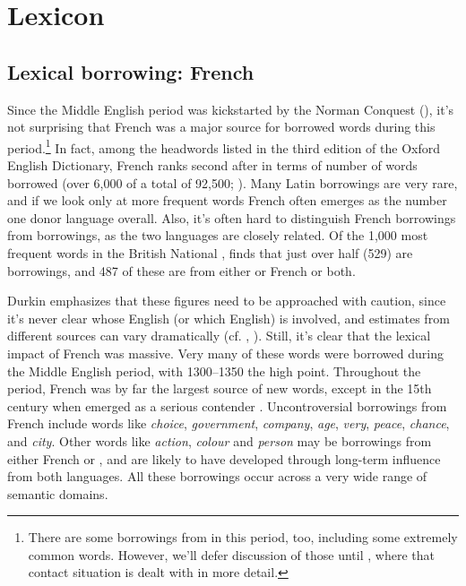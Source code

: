 \section{Lexicon}

\subsection{Lexical borrowing: French}\label{ME-French-borrowing}
Since the Middle English period was kickstarted by the Norman Conquest (), it's not surprising that French was a major source for borrowed words during this period.\footnote{There are some borrowings from  in this period, too, including some extremely common words. However, we'll defer discussion of those until , where that contact situation is dealt with in more detail.} In fact, among the headwords listed in the third edition of the Oxford English Dictionary, French ranks second after  in terms of number of words borrowed (over 6,000 of a total of 92,500; \citealp[25]{Durkin2014}). Many Latin borrowings are very rare, and if we look only at more frequent words French often emerges as the number one donor language overall. Also, it's often hard to distinguish French borrowings from  borrowings, as the two languages are closely related. Of the 1,000 most frequent words in the British National , \citet[37]{Durkin2014} finds that just over half (529) are borrowings, and 487 of these are from either  or French or both.

Durkin emphasizes that these figures need to be approached with caution, since it's never clear whose English (or which English) is involved, and estimates from different sources can vary dramatically (cf. \citealp{Scheler1977}, \citealp{Dekeyser1986}). Still, it's clear that the lexical impact of French was massive. Very many of these words were borrowed during the Middle English period, with 1300--1350 the high point. Throughout the period, French was by far the largest source of new words, except in the 15th century when  emerged as a serious contender \citep[35]{Durkin2014}. Uncontroversial borrowings from French include words like \emph{choice}, \emph{government}, \emph{company}, \emph{age}, \emph{very}, \emph{peace}, \emph{chance}, and \emph{city}. Other words like \emph{action}, \emph{colour} and \emph{person} may be borrowings from either French or , and are likely to have developed through long-term influence from both languages. All these borrowings occur across a very wide range of semantic domains.

